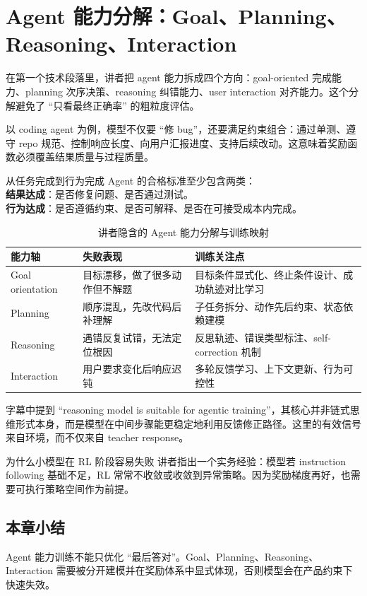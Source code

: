 \section{Agent 能力分解：Goal、Planning、Reasoning、Interaction}

在第一个技术段落里，讲者把 agent 能力拆成四个方向：goal-oriented 完成能力、planning 次序决策、reasoning 纠错能力、user interaction 对齐能力。这个分解避免了 ``只看最终正确率'' 的粗粒度评估。

以 coding agent 为例，模型不仅要 ``修 bug''，还要满足约束组合：通过单测、遵守 repo 规范、控制响应长度、向用户汇报进度、支持后续改动。这意味着奖励函数必须覆盖结果质量与过程质量。

\begin{importantbox}{从任务完成到行为完成}
Agent 的合格标准至少包含两类：\\
\textbf{结果达成}：是否修复问题、是否通过测试。\\
\textbf{行为达成}：是否遵循约束、是否可解释、是否在可接受成本内完成。
\end{importantbox}

\begin{table}[H]
\centering
\begin{tabular}{p{2.2cm}p{3.8cm}p{5.5cm}}
\toprule
\textbf{能力轴} & \textbf{失败表现} & \textbf{训练关注点} \\
\midrule
Goal orientation & 目标漂移，做了很多动作但不解题 & 目标条件显式化、终止条件设计、成功轨迹对比学习 \\
Planning & 顺序混乱，先改代码后补理解 & 子任务拆分、动作先后约束、状态依赖建模 \\
Reasoning & 遇错反复试错，无法定位根因 & 反思轨迹、错误类型标注、self-correction 机制 \\
Interaction & 用户要求变化后响应迟钝 & 多轮反馈学习、上下文更新、行为可控性 \\
\bottomrule
\end{tabular}
\caption{讲者隐含的 Agent 能力分解与训练映射}
\end{table}

字幕中提到 ``reasoning model is suitable for agentic training''，其核心并非链式思维形式本身，而是模型在中间步骤能更稳定地利用反馈修正路径。这里的有效信号来自环境，而不仅来自 teacher response。

\begin{knowledgebox}{为什么小模型在 RL 阶段容易失败}
讲者指出一个实务经验：模型若 instruction following 基础不足，RL 常常不收敛或收敛到异常策略。因为奖励梯度再好，也需要可执行策略空间作为前提。
\end{knowledgebox}

\subsection{本章小结}
Agent 能力训练不能只优化 ``最后答对''。Goal、Planning、Reasoning、Interaction 需要被分开建模并在奖励体系中显式体现，否则模型会在产品约束下快速失效。


